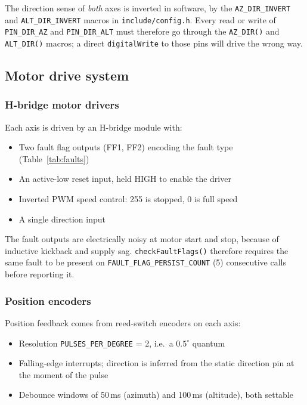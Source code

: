 \documentclass[11pt,a4paper]{article}
\begin{document}
The direction sense of \emph{both} axes is inverted in software, by the \texttt{AZ\_DIR\_INVERT} and \texttt{ALT\_DIR\_INVERT} macros in \texttt{include/config.h}. Every read or write of \texttt{PIN\_DIR\_AZ} and \texttt{PIN\_DIR\_ALT} must therefore go through the \texttt{AZ\_DIR()} and \texttt{ALT\_DIR()} macros; a direct \texttt{digitalWrite} to those pins will drive the wrong way.

\subsection{Motor drive system}

\subsubsection{H-bridge motor drivers}

Each axis is driven by an H-bridge module with:

\begin{itemize}
    \item Two fault flag outputs (FF1, FF2) encoding the fault type (Table~\ref{tab:faults})
    \item An active-low reset input, held HIGH to enable the driver
    \item Inverted PWM speed control: 255 is stopped, 0 is full speed
    \item A single direction input
\end{itemize}

The fault outputs are electrically noisy at motor start and stop, because of inductive kickback and supply sag. \texttt{checkFaultFlags()} therefore requires the same fault to be present on \texttt{FAULT\_FLAG\_PERSIST\_COUNT} (5) consecutive calls before reporting it.

\subsubsection{Position encoders}

Position feedback comes from reed-switch encoders on each axis:

\begin{itemize}
    \item Resolution \texttt{PULSES\_PER\_DEGREE} = 2, i.e.\ a $0.5^\circ$ quantum
    \item Falling-edge interrupts; direction is inferred from the static direction pin at the moment of the pulse
    \item Debounce windows of 50\,ms (azimuth) and 100\,ms (altitude), both settable
\end{itemize}
\end{document}
